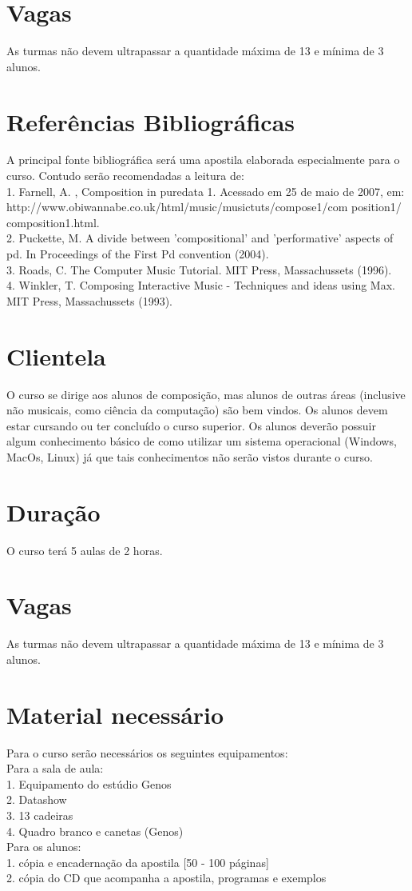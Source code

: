\documentclass{article}
\begin{document}
\section {Vagas}

As turmas não devem ultrapassar a quantidade máxima de 13 e mínima de 3 alunos.

\section {Referências Bibliográficas}A principal fonte bibliográfica será uma apostila elaborada especialmente para o curso.
Contudo serão recomendadas a leitura de:\\
1. Farnell, A. , Composition in puredata 1. Acessado em 25 de maio de 2007, em:\\
http://www.obiwannabe.co.uk/html/music/musictuts/compose1/com
position1/
composition1.html.\\
2. Puckette, M. A divide between ’compositional’ and ’performative’ aspects of pd. In
Proceedings of the First Pd convention (2004).\\
3. Roads, C. The Computer Music Tutorial. MIT Press, Massachussets (1996).\\
4. Winkler, T. Composing Interactive Music - Techniques and ideas using Max. MIT Press,
Massachussets (1993).

\section { Clientela}
O curso se dirige aos alunos de composição, mas alunos de outras áreas (inclusive não
musicais, como ciência da computação) são bem vindos. Os alunos devem estar cursando
ou ter concluído o curso superior. Os alunos deverão possuir algum conhecimento básico de
como utilizar um sistema operacional (Windows, MacOs, Linux) já que tais conhecimentos
não serão vistos durante o curso.
\section {Duração} 
O curso terá 5 aulas de 2 horas.


\section {Vagas} 
As turmas não devem ultrapassar a quantidade máxima de 13 e mínima de 3 alunos.
\section {Material necessário}  
Para o curso serão necessários os seguintes equipamentos:\\
Para a sala de aula:\\
1. Equipamento do estúdio Genos\\
2. Datashow\\
3. 13 cadeiras\\
4. Quadro branco e canetas (Genos)\\
Para os alunos:\\
1. cópia e encadernação da apostila [50 - 100 páginas]\\
2. cópia do CD que acompanha a apostila, programas e exemplos\\
\end{document}
